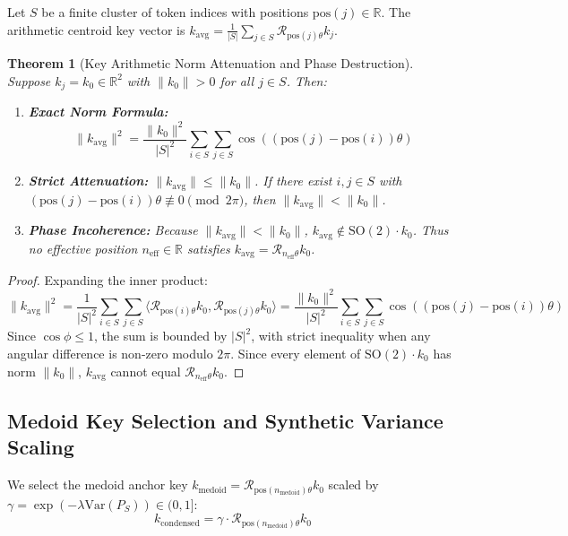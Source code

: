 \documentclass[11pt,reqno]{article}
\theoremstyle{plain}
\newtheorem{theorem}{Theorem}[section]
\theoremstyle{definition}
\theoremstyle{remark}
\newcommand{\R}{\mathbb{R}}
\newcommand{\Var}{\mathrm{Var}}
\begin{document}
Let $S$ be a finite cluster of token indices with positions $\mathrm{pos}(j) \in \R$. The arithmetic centroid key vector is $k_{\mathrm{avg}} = \frac{1}{|S|} \sum_{j \in S} \mathcal{R}_{\mathrm{pos}(j)\theta} k_j$.

\begin{theorem}[Key Arithmetic Norm Attenuation and Phase Destruction]
\label{thm:key_attenuation}
Suppose $k_j = k_0 \in \R^2$ with $\|k_0\| > 0$ for all $j \in S$. Then:
\begin{enumerate}
    \item \textbf{Exact Norm Formula:}
    \[
    \|k_{\mathrm{avg}}\|^2 = \frac{\|k_0\|^2}{|S|^2} \sum_{i \in S} \sum_{j \in S} \cos((\mathrm{pos}(j) - \mathrm{pos}(i))\theta)
    \]
    \item \textbf{Strict Attenuation:} $\|k_{\mathrm{avg}}\| \le \|k_0\|$. If there exist $i, j \in S$ with $(\mathrm{pos}(j) - \mathrm{pos}(i))\theta \not\equiv 0 \pmod{2\pi}$, then $\|k_{\mathrm{avg}}\| < \|k_0\|$.
    \item \textbf{Phase Incoherence:} Because $\|k_{\mathrm{avg}}\| < \|k_0\|$, $k_{\mathrm{avg}} \notin \mathrm{SO}(2) \cdot k_0$. Thus no effective position $n_{\mathrm{eff}} \in \R$ satisfies $k_{\mathrm{avg}} = \mathcal{R}_{n_{\mathrm{eff}}\theta} k_0$.
\end{enumerate}
\end{theorem}

\begin{proof}
Expanding the inner product:
\[
\|k_{\mathrm{avg}}\|^2 = \frac{1}{|S|^2} \sum_{i \in S} \sum_{j \in S} \langle \mathcal{R}_{\mathrm{pos}(i)\theta} k_0, \mathcal{R}_{\mathrm{pos}(j)\theta} k_0 \rangle = \frac{\|k_0\|^2}{|S|^2} \sum_{i \in S} \sum_{j \in S} \cos((\mathrm{pos}(j) - \mathrm{pos}(i))\theta)
\]
Since $\cos\phi \le 1$, the sum is bounded by $|S|^2$, with strict inequality when any angular difference is non-zero modulo $2\pi$. Since every element of $\mathrm{SO}(2) \cdot k_0$ has norm $\|k_0\|$, $k_{\mathrm{avg}}$ cannot equal $\mathcal{R}_{n_{\mathrm{eff}}\theta} k_0$.
\end{proof}

\subsection{Medoid Key Selection and Synthetic Variance Scaling}

We select the medoid anchor key $k_{\mathrm{medoid}} = \mathcal{R}_{\mathrm{pos}(n_{\mathrm{medoid}})\theta} k_0$ scaled by $\gamma = \exp(-\lambda \Var(P_S)) \in (0, 1]$:
\[
k_{\mathrm{condensed}} = \gamma \cdot \mathcal{R}_{\mathrm{pos}(n_{\mathrm{medoid}})\theta} k_0
\]
\end{document}
